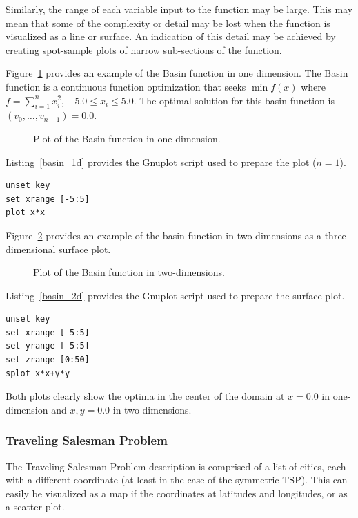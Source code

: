 Similarly, the range of each variable input to the function may be large. This may mean that some of the complexity or detail may be lost when the function is visualized as a line or surface. An indication of this detail may be achieved by creating spot-sample plots of narrow sub-sections of the function. 

Figure~\ref{plot:basin1} provides an example of the Basin function in one dimension. The Basin function is a  continuous function optimization that seeks $\min f(x)$ where $f=\sum_{i=1}^n x_{i}^2$, $-5.0\leq x_i \leq 5.0$. The optimal solution for this basin function is $(v_0,\ldots,v_{n-1})=0.0$. 

\begin{figure}[htp]
\centering

\caption{Plot of the Basin function in one-dimension.}
\label{plot:basin1}
\end{figure}

Listing~\ref{basin_1d} provides the Gnuplot script used to prepare the plot ($n=1$).

\begin{lstlisting}[caption=Gnuplot script for plotting the Basin function in one-dimension., label=basin_1d]
unset key
set xrange [-5:5]
plot x*x
\end{lstlisting}

Figure~\ref{plot:basin2} provides an example of the basin function in two-dimensions as a three-dimensional surface plot.

\begin{figure}[htp]
\centering

\caption{Plot of the Basin function in two-dimensions.}
\label{plot:basin2}
\end{figure}

Listing~\ref{basin_2d} provides the Gnuplot script used to prepare the surface plot.

\begin{lstlisting}[caption=Gnuplot script for plotting the Basin function in two-dimensions, label=basin_2d]
unset key
set xrange [-5:5]
set yrange [-5:5]
set zrange [0:50]
splot x*x+y*y
\end{lstlisting}

Both plots clearly show the optima in the center of the domain at $x=0.0$ in one-dimension and $x,y=0.0$ in two-dimensions.

\subsubsection{Traveling Salesman Problem}
The Traveling Salesman Problem description is comprised of a list of cities, each with a different coordinate (at least in the case of the symmetric TSP). This can easily be visualized as a map if the coordinates at latitudes and longitudes, or as a scatter plot.

